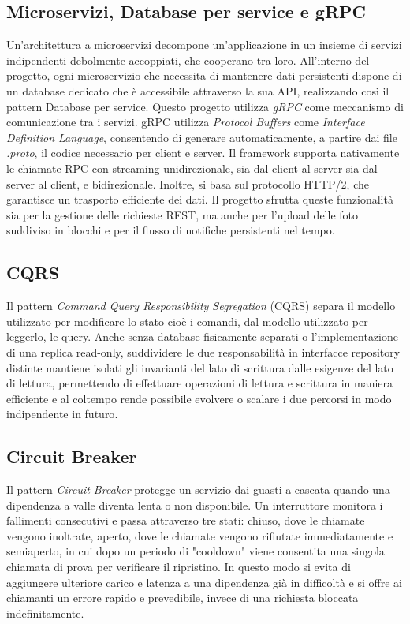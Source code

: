 \documentclass[conference]{IEEEtran}
\begin{document}
\subsection{Microservizi, Database per service e gRPC}
Un'architettura a microservizi decompone un'applicazione in un insieme di servizi indipendenti debolmente accoppiati, che cooperano tra loro. All'interno del progetto, ogni microservizio che necessita di mantenere dati persistenti dispone di un database dedicato che è accessibile attraverso la sua API, realizzando così il pattern Database per service. Questo progetto utilizza \textit{gRPC} come meccanismo di comunicazione tra i servizi. gRPC utilizza \textit{Protocol Buffers} come \textit{Interface Definition Language}, consentendo di generare automaticamente, a partire dai file \textit{.proto}, il codice necessario per client e server. Il framework supporta nativamente le chiamate RPC con streaming unidirezionale, sia dal client al server sia dal server al client, e bidirezionale. Inoltre, si basa sul protocollo HTTP/2, che garantisce un trasporto efficiente dei dati. Il progetto sfrutta queste funzionalità sia per la gestione delle richieste REST, ma anche per l'upload delle foto suddiviso in blocchi e per il flusso di notifiche persistenti nel tempo\cite{b3,b5,b18}.
\subsection{CQRS}
Il pattern \textit{Command Query Responsibility Segregation} (CQRS) separa il modello utilizzato per modificare lo stato cioè i comandi, dal modello utilizzato per leggerlo, le query. Anche senza database fisicamente separati o l'implementazione di una replica read-only, suddividere le due responsabilità in interfacce repository distinte mantiene isolati gli invarianti del lato di scrittura dalle esigenze del lato di lettura, permettendo di effettuare operazioni di lettura e scrittura in maniera efficiente e al coltempo rende possibile evolvere o scalare i due percorsi in modo indipendente in futuro\cite{b1}.
\subsection{Circuit Breaker}
Il pattern \textit{Circuit Breaker} protegge un servizio dai guasti a cascata quando una dipendenza a valle diventa lenta o non disponibile. Un interruttore monitora i fallimenti consecutivi e passa attraverso tre stati: chiuso, dove le chiamate vengono inoltrate, aperto, dove le chiamate vengono rifiutate immediatamente e semiaperto, in cui dopo un periodo di "cooldown" viene consentita una singola chiamata di prova per verificare il ripristino. In questo modo si evita di aggiungere ulteriore carico e latenza a una dipendenza già in difficoltà e si offre ai chiamanti un errore rapido e prevedibile, invece di una richiesta bloccata indefinitamente\cite{b2}.
\end{document}
